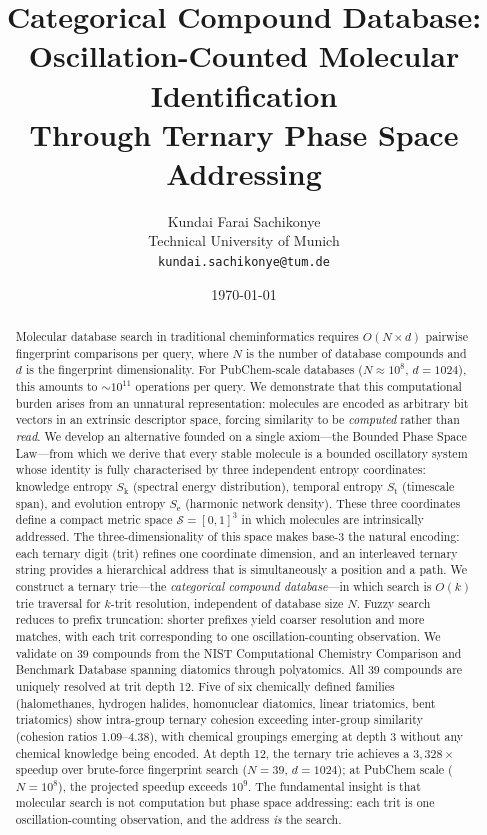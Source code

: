 \documentclass[11pt,a4paper]{article}
\theoremstyle{definition}
\theoremstyle{remark}
\newcommand{\Sk}{S_{\mathrm{k}}}
\newcommand{\St}{S_{\mathrm{t}}}
\newcommand{\Se}{S_{\mathrm{e}}}
\newcommand{\Sspace}{\mathcal{S}}
\begin{document}
\title{\textbf{Categorical Compound Database: \\
Oscillation-Counted Molecular Identification \\
Through Ternary Phase Space Addressing}}

\author{
Kundai Farai Sachikonye\\
Technical University of Munich\\
\texttt{kundai.sachikonye@tum.de}
}

\date{\today}

\maketitle

\begin{abstract}
Molecular database search in traditional cheminformatics requires $O(N \times d)$ pairwise fingerprint comparisons per query, where $N$ is the number of database compounds and $d$ is the fingerprint dimensionality. For PubChem-scale databases ($N \approx 10^8$, $d = 1024$), this amounts to $\sim 10^{11}$ operations per query. We demonstrate that this computational burden arises from an unnatural representation: molecules are encoded as arbitrary bit vectors in an extrinsic descriptor space, forcing similarity to be \emph{computed} rather than \emph{read}. We develop an alternative founded on a single axiom---the Bounded Phase Space Law---from which we derive that every stable molecule is a bounded oscillatory system whose identity is fully characterised by three independent entropy coordinates: knowledge entropy $\Sk$ (spectral energy distribution), temporal entropy $\St$ (timescale span), and evolution entropy $\Se$ (harmonic network density). These three coordinates define a compact metric space $\Sspace = [0,1]^3$ in which molecules are intrinsically addressed. The three-dimensionality of this space makes base-3 the natural encoding: each ternary digit (trit) refines one coordinate dimension, and an interleaved ternary string provides a hierarchical address that is simultaneously a position and a path. We construct a ternary trie---the \emph{categorical compound database}---in which search is $O(k)$ trie traversal for $k$-trit resolution, independent of database size $N$. Fuzzy search reduces to prefix truncation: shorter prefixes yield coarser resolution and more matches, with each trit corresponding to one oscillation-counting observation. We validate on 39 compounds from the NIST Computational Chemistry Comparison and Benchmark Database spanning diatomics through polyatomics. All 39 compounds are uniquely resolved at trit depth 12. Five of six chemically defined families (halomethanes, hydrogen halides, homonuclear diatomics, linear triatomics, bent triatomics) show intra-group ternary cohesion exceeding inter-group similarity (cohesion ratios 1.09--4.38), with chemical groupings emerging at depth 3 without any chemical knowledge being encoded. At depth 12, the ternary trie achieves a $3{,}328\times$ speedup over brute-force fingerprint search ($N = 39$, $d = 1024$); at PubChem scale ($N = 10^8$), the projected speedup exceeds $10^9$. The fundamental insight is that molecular search is not computation but phase space addressing: each trit is one oscillation-counting observation, and the address \emph{is} the search.

\end{abstract}
\end{document}
